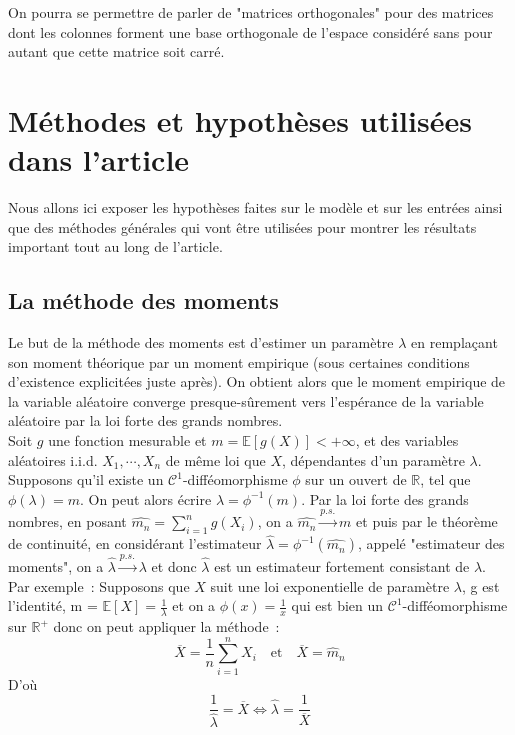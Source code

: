 \documentclass[12pt]{article}
\begin{document}
On pourra se permettre de parler de "matrices orthogonales" pour des matrices dont les colonnes forment une base orthogonale de l'espace considéré sans pour autant que cette matrice soit carré. 

\section{Méthodes et hypothèses utilisées dans l'article}\label{Méthode_hypo}

Nous allons ici exposer les hypothèses faites sur le modèle et sur les entrées ainsi que des méthodes générales qui vont être utilisées pour montrer les résultats important tout au long de l'article.

\subsection{La méthode des moments}\label{moments}
Le but de la méthode des moments est d'estimer un paramètre $\lambda$ en remplaçant son moment théorique par un moment empirique (sous certaines conditions d'existence explicitées juste après). On obtient alors que le moment empirique de la variable aléatoire converge presque-sûrement vers l'espérance de la variable aléatoire par la loi forte des grands nombres.\\

Soit $g$ une fonction mesurable et $m = \mathbb{E}[g(X)] < + \infty$, et des variables aléatoires i.i.d. $X_1, \cdots, X_n$ de même loi que $X$, dépendantes d'un paramètre $\lambda$. Supposons qu'il existe un $\mathcal{C}^1$-difféomorphisme $\phi$ sur un ouvert de $\mathbb{R}$, tel que $\phi(\lambda) = m$. On peut alors écrire $\lambda = \phi^{-1}(m)$. Par la loi forte des grands nombres, en posant $\hat{m_n} = \sum_{i=1}^{n} g(X_i)$, on a $\hat{m_n} \xrightarrow{p.s.} m$ et puis par le théorème de continuité, en considérant l'estimateur $\hat{\lambda} = \phi^{-1}(\hat{m_{n}})$, appelé "estimateur des moments", on a $\hat{\lambda} \xrightarrow{p.s.} \lambda$ et donc $\hat{\lambda}$ est un estimateur fortement consistant de $\lambda$. \\
Par exemple~: Supposons que $X$ suit une loi exponentielle de paramètre $\lambda$, g est l'identité, m = $\mathbb{E}[X]= \frac{1}{\lambda}$ et on a $\phi(x) = \frac{1}{x}$ qui est bien un $\mathcal{C}^1$-difféomorphisme sur $\mathbb{R}^{+}$ donc on peut appliquer la méthode~: 
$$
\overline{X} = \frac{1}{n} \sum_{i=1}^{n} X_i \quad \text{et} \quad \overline{X} = \hat m_n
$$
D'où
$$
\frac{1}{\hat \lambda} = \overline{X} \Leftrightarrow \hat \lambda = \frac{1}{\overline{X}}
$$
\end{document}
